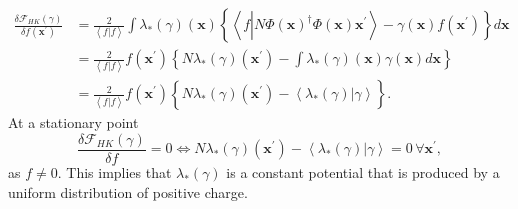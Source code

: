 \documentclass[aps,preprint]{revtex4}%
\begin{document}
\begin{align}
\frac{\delta\mathcal{F}_{HK}\left(  \gamma\right)  }{\delta f\left(
\mathbf{x}^{\prime}\right)  }  &  =\frac{2}{\left\langle f|f\right\rangle
}\int\lambda_{\ast}\left(  \gamma\right)  \left(  \mathbf{x}\right)  \left\{
\left\langle f\left\vert \overset{}{N\Phi\left(  \mathbf{x}\right)  ^{\dagger
}\Phi\left(  \mathbf{x}\right)  }\right.  \mathbf{x}^{\prime}\right\rangle
-\gamma\left(  \mathbf{x}\right)  f\left(  \mathbf{x}^{\prime}\right)
\right\}  d\mathbf{x}\nonumber\\
&  =\frac{2}{\left\langle f|f\right\rangle }f\left(  \mathbf{x}^{\prime
}\right)  \left\{  N\lambda_{\ast}\left(  \gamma\right)  \left(
\mathbf{x}^{\prime}\right)  -\int\lambda_{\ast}\left(  \gamma\right)  \left(
\mathbf{x}\right)  \gamma\left(  \mathbf{x}\right)  d\mathbf{x}\right\}
\nonumber\\
&  =\frac{2}{\left\langle f|f\right\rangle }f\left(  \mathbf{x}^{\prime
}\right)  \left\{  \overset{}{N\lambda_{\ast}\left(  \gamma\right)  \left(
\mathbf{x}^{\prime}\right)  -\left\langle \left.  \lambda_{\ast}\left(
\gamma\right)  \right\vert \gamma\right\rangle }\right\}  .
\end{align}
At a stationary point
\begin{equation}
\frac{\delta\mathcal{F}_{HK}\left(  \gamma\right)  }{\delta f}%
=0\Leftrightarrow N\lambda_{\ast}\left(  \gamma\right)  \left(  \mathbf{x}%
^{\prime}\right)  -\left\langle \left.  \lambda_{\ast}\left(  \gamma\right)
\right\vert \gamma\right\rangle =0\,\forall\mathbf{x}^{\prime}, \label{Ustat}%
\end{equation}
as $f\neq0.$ This implies that $\lambda_{\ast}\left(  \gamma\right)  $ is a
constant potential that is produced by a uniform distribution of positive charge.
\end{document}
